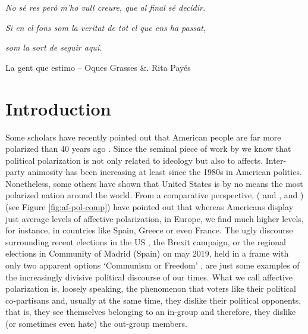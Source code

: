 \documentclass[a4paper, svgnames]{article}
\begin{document}
\text{ }

\begin{flushright}
	\textit{No sé res però m'ho vull creure, que al final sé decidir.}

	\textit{Si en el fons som la veritat de tot el que ens ha passat,}

	\textit{som la sort de seguir aquí.}

	La gent que estimo – Oques Grasses \&. Rita Payés
\end{flushright}



\vfill
\newpage %
\thispagestyle{empty}
\mbox{}
\newpage

\tableofcontents

\newpage %
\thispagestyle{empty}
\mbox{}

\newpage
\listoffigures

\newpage %
\thispagestyle{empty}
\mbox{}


\listoftables

\newpage %
\thispagestyle{empty}
\mbox{}

\clearpage
{}

\section{Introduction}

Some scholars have recently pointed out that American people are far more polarized than 40 years ago \citep{Lelkes2018}. Since the seminal piece of work by \cite{Iyengar2012} we know that political polarization is not only related to ideology but also to affects. Inter-party animosity has been increasing at least since the 1980s in American politics. Nonetheless, some others have shown that United States is by no means the most polarized nation around the world. From a comparative perspective, (\citeauthor{Gidron2018} \citeyear{Gidron2018} and \citeyear{Gidron2019}, and \cite{WESTWOOD2018}) (see Figure \ref{fig:af-pol-comp}) have pointed out that whereas Americans display just average levels of affective polarization, in Europe, we find much higher levels, for instance, in countries like Spain, Greece or even France. The ugly discourse surrounding recent elections in the US \citep*{AmericaUglyElection}, the Brexit campaign, or the regional elections in Community of Madrid (Spain) on may 2019, held in a frame with only two apparent options `Communism or Freedom' \citep*{elconfindencialComunismoLibertadIsabel2021}, are just some examples of the increasingly divisive political discourse of our times. What we call affective polarization is, loosely speaking, the phenomenon that voters like their political co-partisans and, usually at the same time, they dislike their political opponents, that is, they see themselves belonging to an in-group and therefore, they dislike (or sometimes even hate) the out-group members.
\end{document}
